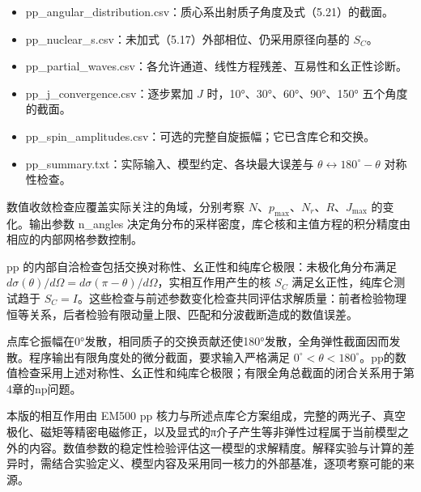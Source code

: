 \documentclass[UTF8,a4paper,zihao=5,fontset=fandol]{ctexart}
\begin{document}
\begin{itemize}
\item {\ttfamily\small pp\_\allowbreak{}angular\_\allowbreak{}distribution.\allowbreak{}csv}：质心系出射质子角度及式（5.21）的截面。


\item {\ttfamily\small pp\_\allowbreak{}nuclear\_\allowbreak{}s.\allowbreak{}csv}：未加式（5.17）外部相位、仍采用原径向基的 \(S_C\)。


\item {\ttfamily\small pp\_\allowbreak{}partial\_\allowbreak{}waves.\allowbreak{}csv}：各允许通道、线性方程残差、互易性和幺正性诊断。


\item {\ttfamily\small pp\_\allowbreak{}j\_\allowbreak{}convergence.\allowbreak{}csv}：逐步累加 \(J\) 时，10°、30°、60°、90°、150° 五个角度的截面。


\item {\ttfamily\small pp\_\allowbreak{}spin\_\allowbreak{}amplitudes.\allowbreak{}csv}：可选的完整自旋振幅；它已含库仑和交换。


\item {\ttfamily\small pp\_\allowbreak{}summary.\allowbreak{}txt}：实际输入、模型约定、各块最大误差与 \(\theta\leftrightarrow180^\circ-\theta\) 对称性检查。


\end{itemize}
数值收敛检查应覆盖实际关注的角域，分别考察 \(N\)、\(p_{\max}\)、\(N_r\)、\(R\)、\(J_{\max}\) 的变化。输出参数 {\ttfamily\small n\_\allowbreak{}angles} 决定角分布的采样密度，库仑核和主值方程的积分精度由相应的内部网格参数控制。

pp 的内部自洽检查包括交换对称性、幺正性和纯库仑极限：未极化角分布满足 \(d\sigma(\theta)/d\Omega=d\sigma(\pi-\theta)/d\Omega\)，实相互作用产生的核 \(S_C\) 满足幺正性，纯库仑测试趋于 \(S_C=I\)。这些检查与前述参数变化检查共同评估求解质量：前者检验物理恒等关系，后者检验有限动量上限、匹配和分波截断造成的数值误差。

点库仑振幅在0°发散，相同质子的交换贡献还使180°发散，全角弹性截面因而发散。程序输出有限角度处的微分截面，要求输入严格满足 \(0^\circ<\theta<180^\circ\)。pp的数值检查采用上述对称性、幺正性和纯库仑极限；有限全角总截面的闭合关系用于第4章的np问题。

本版的相互作用由 EM500 pp 核力与所述点库仑方案组成，完整的两光子、真空极化、磁矩等精密电磁修正，以及显式的π介子产生等非弹性过程属于当前模型之外的内容。数值参数的稳定性检验评估这一模型的求解精度。解释实验与计算的差异时，需结合实验定义、模型内容及采用同一核力的外部基准，逐项考察可能的来源。
\end{document}
